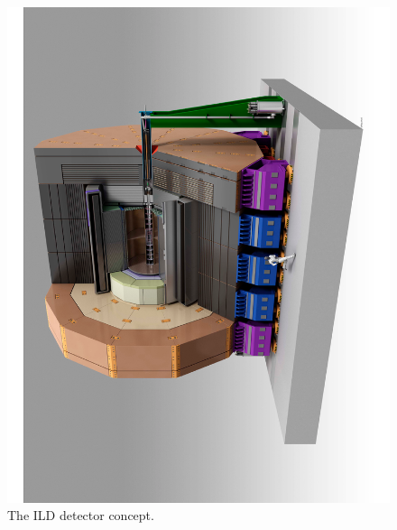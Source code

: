 \documentclass[%
 reprint,
 amsmath,amssymb,
 aps,
]{revtex4-1}
\begin{document}
\begin{figure}[tb]
 \begin{center}
 \includegraphics[width=0.8\hsize,angle=-90]{figures/ILD.pdf}
\caption{The ILD detector concept.
\label{fig_ild}}
 \end{center}
 \end{figure}
 
\end{document}
